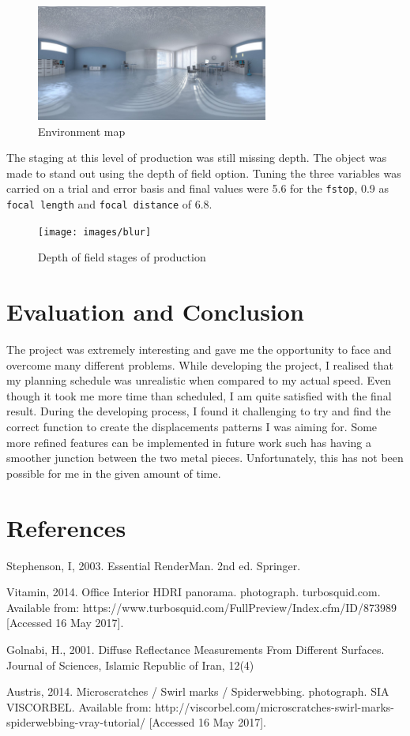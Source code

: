 \documentclass[tog]{acmsiggraph}
\begin{document}
\begin{figure}[ht]
  \centering
  \includegraphics[width=3.0in]{images/office}
  \caption{Environment map}
  \label{fig:office}
\end{figure}

\newpage
The staging at this level of production was still missing depth. The object was made to stand out using the depth of field option. Tuning the three variables was carried on a trial and error basis and final values were 5.6 for the \texttt{fstop}, 0.9 as \texttt{focal length} and \texttt{focal distance} of 6.8.

\begin{figure}[ht]
  \centering
  \texttt{[image: images/blur]}
  \caption{Depth of field stages of production}
  \label{fig:blur}
\end{figure}

\section{Evaluation and Conclusion}

The project was extremely interesting and gave me the opportunity to face and overcome many different problems. While developing the project, I realised that my planning schedule was unrealistic when compared to my actual speed. Even though it took me more time than scheduled, I am quite satisfied with the final result. During the developing process, I found it challenging to try and find the correct function to create the displacements patterns I was aiming for. Some more refined features can be implemented in future work such has having a smoother junction between the two metal pieces. Unfortunately, this has not been possible for me in the given amount of time.

\section{References}

Stephenson, I, 2003. Essential RenderMan. 2nd ed. Springer.

Vitamin, 2014. Office Interior HDRI panorama. photograph. turbosquid.com. Available from: https://www.turbosquid.com/FullPreview/Index.cfm/ID/873989 [Accessed 16 May 2017].

Golnabi, H., 2001. Diffuse Reflectance Measurements From Different Surfaces. Journal of Sciences, Islamic Republic of Iran, 12(4)

Austris, 2014. Microscratches / Swirl marks / Spiderwebbing. photograph. SIA VISCORBEL. Available from: http://viscorbel.com/microscratches-swirl-marks-spiderwebbing-vray-tutorial/ [Accessed 16 May 2017].
\end{document}
